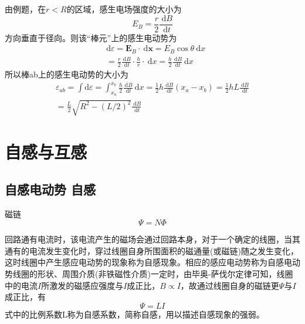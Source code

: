 \documentclass[
	12pt, %
	a4paper, %
]{myLegrandOrangeBook}
\begin{document}
由例题，在\(r < R\)的区域，感生电场强度的大小为
\begin{equation*}
    E_B=\frac{r}{2} \frac{\mathrm{~d} B}{\mathrm{~d} t}
\end{equation*}
方向垂直于径向。则该“棒元”上的感生电动势为
\begin{equation*}
\begin{aligned}
& \mathrm{d} \varepsilon=\boldsymbol{E}_B \cdot \mathrm{~d} \boldsymbol{x}=E_B \cos \theta \mathrm{~d} x \\
& =\frac{r}{2} \frac{\mathrm{~d} B}{\mathrm{~d} t} \cdot \frac{h}{r} \cdot \mathrm{~d} x=\frac{h}{2} \frac{\mathrm{~d} B}{\mathrm{~d} t} \mathrm{~d} x
\end{aligned}
\end{equation*}
所以棒ab上的感生电动势的大小为
\begin{equation*}
\begin{gathered}
\varepsilon_{a b}=\int \mathrm{d} \varepsilon=\int_{x_a}^{x_b} \frac{h}{2} \frac{\mathrm{~d} B}{\mathrm{~d} t} \mathrm{~d} x=\frac{1}{2} h \frac{\mathrm{~d} B}{\mathrm{~d} t}\left(x_a-x_b\right)=\frac{1}{2} h L \frac{\mathrm{~d} B}{\mathrm{~d} t} \\
=\frac{L}{2} \sqrt{R^2-(L / 2)^2} \frac{\mathrm{~d} B}{\mathrm{~d} t}
\end{gathered}
\end{equation*}


\section{自感与互感}

\subsection{自感电动势 \quad 自感}

磁链
\begin{equation}
    \varPsi = N \varPhi
\end{equation}

回路通有电流时，该电流产生的磁场会通过回路本身，对于一个确定的线圈，当其通有的电流发生变化时，穿过线圈自身所围面积的磁通量(或磁链)随之发生变化，这时线圈中产生感应电动势的现象称为自感现象。相应的感应电动势称为自感电动势线圈的形状、周围介质(非铁磁性介质)一定时，由毕奥-萨伐尔定律可知，线圈中的电流\(I\)所激发的磁感应强度与\(I\)成正比，\(B \propto I\)，故通过线圈自身的磁链更\(\varPsi\)与\(I\)成正比，有
\begin{equation}
    \varPsi = L I
\end{equation}
式中的比例系数L称为自感系数，简称自感，用以描述自感现象的强弱。
\end{document}
